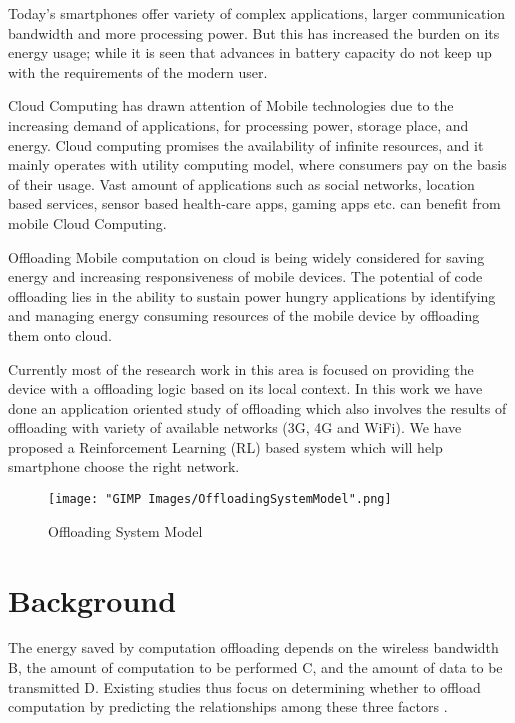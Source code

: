 \documentclass{report}
\begin{document}
Today's smartphones offer variety of complex applications, larger communication bandwidth and more processing power. But this has increased the burden on its energy usage; while it is seen that advances in battery capacity do not keep up with the requirements of the modern user.

Cloud Computing has drawn attention of Mobile technologies due to the increasing demand of applications, for processing power, storage place, and energy. Cloud computing promises the availability of infinite resources, and it mainly operates with utility computing model, where consumers pay on the basis of their usage. Vast amount of applications such as social networks, location based services, sensor based health-care apps, gaming apps etc. can benefit from mobile Cloud Computing.

Offloading Mobile computation on cloud is being widely considered for saving energy and increasing responsiveness of mobile devices.
The potential of code offloading lies in the ability to sustain power hungry applications by identifying and managing energy consuming resources of the mobile device by offloading them onto cloud. 

Currently most of the research work in this area is focused on providing the device with a offloading logic based on its local context. In this work we have done an application oriented study of offloading which also involves the results of offloading with variety of available networks (3G, 4G and WiFi). We have proposed a Reinforcement Learning (RL) based system which will help smartphone choose the right network. 

\begin{figure}[h]
  \centering
  \texttt{[image: "GIMP Images/OffloadingSystemModel".png]}
  \caption{Offloading System Model}
  \label{fig:OffloadingSystemModel}
\end{figure}

\section{Background}

The energy saved by computation offloading depends on the wireless bandwidth B, the amount of computation to be performed C, and the amount of data to be transmitted D. Existing studies thus focus on determining whether to offload computation by predicting
the relationships among these three factors \cite{kumar2010cloud}.
\end{document}
